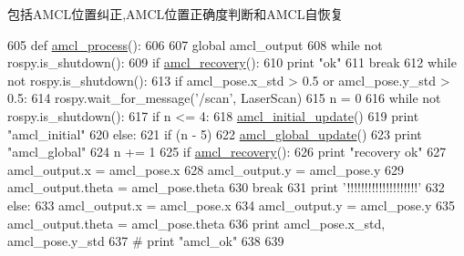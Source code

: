 包括\+A\+M\+C\+L位置纠正,A\+M\+C\+L位置正确度判断和\+A\+M\+C\+L自恢复 
\begin{DoxyCode}
605 \textcolor{keyword}{def }\hyperlink{namespaceselect___a__dox_afd73791153a71f1fcddb1b58d87fcf6e}{amcl\_process}():
606 
607     \textcolor{keyword}{global} amcl\_output
608     \textcolor{keywordflow}{while} \textcolor{keywordflow}{not} rospy.is\_shutdown():
609         \textcolor{keywordflow}{if} \hyperlink{namespaceselect___a__dox_a37dfe6ff00e8834a1d53c1612354758c}{amcl\_recovery}():
610             \textcolor{keywordflow}{print} \textcolor{stringliteral}{"ok"}
611             \textcolor{keywordflow}{break}
612     \textcolor{keywordflow}{while} \textcolor{keywordflow}{not} rospy.is\_shutdown():
613         \textcolor{keywordflow}{if} amcl\_pose.x\_std > 0.5 \textcolor{keywordflow}{or} amcl\_pose.y\_std > 0.5:
614             rospy.wait\_for\_message(\textcolor{stringliteral}{'/scan'}, LaserScan)
615             n = 0
616             \textcolor{keywordflow}{while} \textcolor{keywordflow}{not} rospy.is\_shutdown():
617                 \textcolor{keywordflow}{if} n <= 4:
618                     \hyperlink{namespaceselect___a__dox_aaae6f4a3d568931c6038b1e3cbfb6f9a}{amcl\_initial\_update}()
619                     \textcolor{keywordflow}{print} \textcolor{stringliteral}{"amcl\_initial"}
620                 \textcolor{keywordflow}{else}:
621                     \textcolor{keywordflow}{if} (n - 5) %
622                         \hyperlink{namespaceselect___a__dox_a4c38eb63cc34fdb7d60461a006f34100}{amcl\_global\_update}()
623                         \textcolor{keywordflow}{print} \textcolor{stringliteral}{"amcl\_global"}
624                 n += 1
625                 \textcolor{keywordflow}{if} \hyperlink{namespaceselect___a__dox_a37dfe6ff00e8834a1d53c1612354758c}{amcl\_recovery}():
626                     \textcolor{keywordflow}{print} \textcolor{stringliteral}{"recovery ok"}
627                     amcl\_output.x = amcl\_pose.x
628                     amcl\_output.y = amcl\_pose.y
629                     amcl\_output.theta = amcl\_pose.theta
630                     \textcolor{keywordflow}{break}
631             \textcolor{keywordflow}{print} \textcolor{stringliteral}{'!!!!!!!!!!!!!!!!!!!!'}
632         \textcolor{keywordflow}{else}:
633             amcl\_output.x = amcl\_pose.x
634             amcl\_output.y = amcl\_pose.y
635             amcl\_output.theta = amcl\_pose.theta
636             \textcolor{keywordflow}{print} amcl\_pose.x\_std, amcl\_pose.y\_std
637             \textcolor{comment}{# print "amcl\_ok"}
638 
639 
\end{DoxyCode}
\mbox{\label{namespaceselect___a__dox_a37dfe6ff00e8834a1d53c1612354758c}} 
